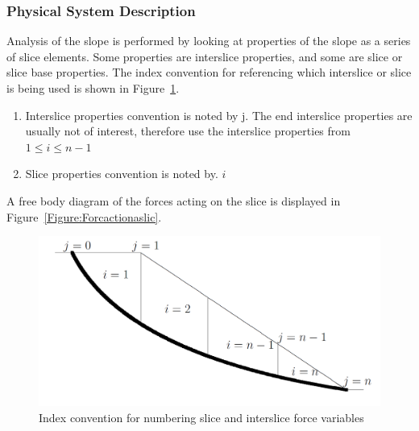 \documentclass[12pt]{article}
\begin{document}
\subsubsection{Physical System Description}
\label{Sec:PhysSystDesc}
Analysis of the slope is performed by looking at properties of the slope as a series of slice elements. Some properties are interslice properties, and some are slice or slice base properties. The index convention for referencing which interslice or slice is being used is shown in Figure~\ref{Figure:Indeconvfornumbslicandinteforcvaris}.
\begin{enumerate}
\item{Interslice properties convention is noted by j. The end interslice properties are usually not of interest, therefore use the interslice properties from $1\leq{}i\leq{}n-1$}
\item{Slice properties convention is noted by. $i$}
\end{enumerate}
A free body diagram of the forces acting on the slice is displayed in Figure~\ref{Figure:Forcactionaslic}.
\begin{figure}
\begin{center}
\includegraphics{IndexConvention.png}
\caption{Index convention for numbering slice and interslice force variables}
\label{Figure:Indeconvfornumbslicandinteforcvaris}
\end{center}
\end{figure}
\end{document}
